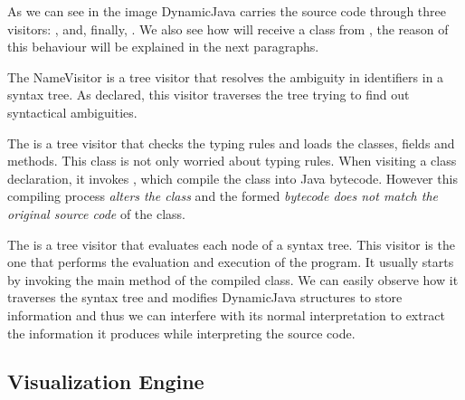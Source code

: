 As we can see in the image DynamicJava carries the source code
through three visitors: ,  and, finally, .
We also see how  will receive a class from ,
the reason of this behaviour will be explained in the next paragraphs.

The NameVisitor is a tree visitor that resolves the ambiguity in identifiers in a syntax tree.
As declared, this visitor traverses the tree trying to find out syntactical ambiguities.

The  is a tree visitor that checks the typing rules and loads the
classes, fields and methods.
This  class is not only worried about typing rules.
When visiting a class declaration, it invokes , which
compile the class into Java bytecode. However this compiling
process \textit{alters the class} and the formed \textit{bytecode does
not match the original source code} of the class.

The  is a tree visitor that evaluates each node of a syntax tree.
This visitor is the one that performs the evaluation and execution
of the program. It usually starts by invoking the main method
of the compiled class. We can easily observe how it traverses
the syntax tree and modifies DynamicJava structures to store information
and thus we can interfere with its normal interpretation to extract
the information it produces while interpreting the source code.


\subsection{Visualization Engine}
\label{sec:Visualization_Engine}


